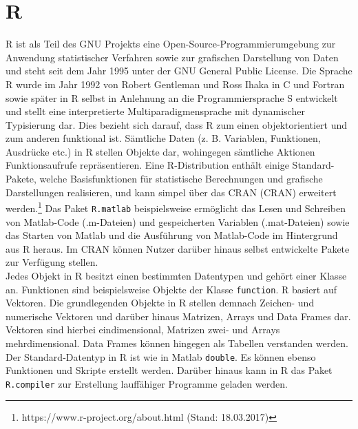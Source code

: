 %


\section{R}

R ist als Teil des GNU Projekts eine Open-Source-Programmierumgebung zur Anwendung statistischer Verfahren sowie zur grafischen Darstellung von Daten und steht seit dem Jahr 1995 unter der GNU General Public License. Die Sprache R wurde im Jahr 1992 von Robert Gentleman und Ross Ihaka in C und Fortran sowie später in R selbst in Anlehnung an die Programmiersprache S entwickelt und stellt eine interpretierte Multiparadigmensprache mit dynamischer Typisierung dar. Dies bezieht sich darauf, dass R zum einen objektorientiert und zum anderen funktional ist. Sämtliche Daten (z. B. Variablen, Funktionen, Ausdrücke etc.) in R stellen Objekte dar, wohingegen sämtliche Aktionen Funktionsaufrufe repräsentieren. Eine R-Distribution enthält einige Standard-Pakete, welche Basisfunktionen für statistische Berechnungen und grafische Darstellungen realisieren, und kann simpel über das \acl{CRAN} (\acs{CRAN}) erweitert werden.\footnote{https://www.r-project.org/about.html (Stand: 18.03.2017)} Das Paket \texttt{R.matlab} beispielsweise ermöglicht das Lesen und Schreiben von Matlab-Code (.m-Dateien) und gespeicherten Variablen (.mat-Dateien) sowie das Starten von Matlab und die Ausführung von Matlab-Code im Hintergrund aus R heraus. Im \acs{CRAN} können Nutzer darüber hinaus selbst entwickelte Pakete zur Verfügung stellen. \parencite{adler_r_2012}\\

Jedes Objekt in R besitzt einen bestimmten Datentypen und gehört einer Klasse an. Funktionen sind beispielsweise Objekte der Klasse \texttt{function}. R basiert auf Vektoren. Die grundlegenden Objekte in R stellen demnach Zeichen- und numerische Vektoren und darüber hinaus Matrizen, Arrays und Data Frames dar. Vektoren sind hierbei eindimensional, Matrizen zwei- und Arrays mehrdimensional. Data Frames können hingegen als Tabellen verstanden werden. Der Standard-Datentyp in R ist wie in Matlab \texttt{double}. Es können ebenso Funktionen und Skripte erstellt werden. Darüber hinaus kann in R das Paket \texttt{R.compiler} zur Erstellung lauffähiger Programme geladen werden.\\

